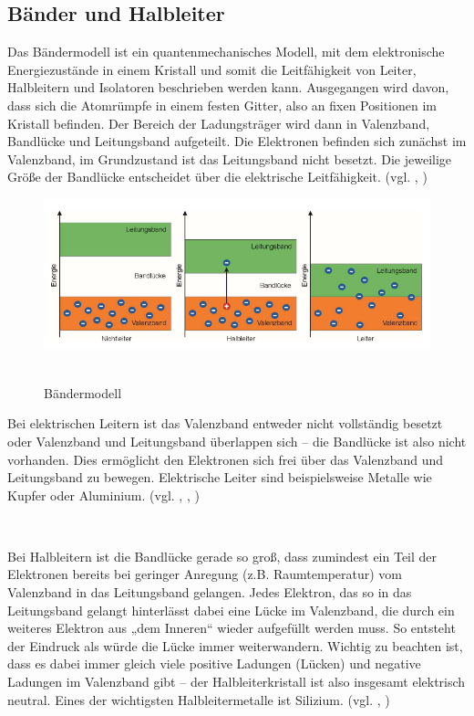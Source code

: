 \documentclass{article}
\begin{document}
\subsection{Bänder und Halbleiter}

Das Bändermodell ist ein quantenmechanisches Modell, mit dem elektronische Energiezustände in einem Kristall und somit die Leitfähigkeit von Leiter, Halbleitern und Isolatoren beschrieben werden kann. Ausgegangen wird davon, dass sich die Atomrümpfe in einem festen Gitter, also an fixen Positionen im Kristall befinden. Der Bereich der Ladungsträger wird dann in Valenzband, Bandlücke und Leitungsband aufgeteilt. Die Elektronen befinden sich zunächst im Valenzband, im Grundzustand ist das Leitungsband nicht besetzt. Die jeweilige Größe der Bandlücke entscheidet über die elektrische Leitfähigkeit. (vgl. \cite{moodle}, \cite{halbleiter})


\begin{figure}[H]
\caption{Bändermodell}
\label{fig:baender}
{\centering
\includegraphics[scale=1.7]{baender.png}
~
}
\end{figure}


Bei elektrischen Leitern ist das Valenzband entweder nicht vollständig besetzt oder Valenzband und Leitungsband überlappen sich – die Bandlücke ist also nicht vorhanden. Dies ermöglicht den Elektronen sich frei über das Valenzband und Leitungsband zu bewegen. Elektrische Leiter sind beispielsweise Metalle wie Kupfer oder Aluminium. (vgl. \cite{moodle}, \cite{cosmos}, \cite{greenlane})

~

Bei Halbleitern ist die Bandlücke gerade so groß, dass zumindest ein Teil der Elektronen bereits bei geringer Anregung (z.B. Raumtemperatur) vom Valenzband in das Leitungsband gelangen. Jedes Elektron, das so in das Leitungsband gelangt hinterlässt dabei eine Lücke im Valenzband, die durch ein weiteres Elektron aus „dem Inneren“ wieder aufgefüllt werden muss. So entsteht der Eindruck als würde die Lücke immer weiterwandern. Wichtig zu beachten ist, dass es dabei immer gleich viele positive Ladungen (Lücken) und negative Ladungen im Valenzband gibt – der Halbleiterkristall ist also insgesamt elektrisch neutral. Eines der wichtigsten Halbleitermetalle ist Silizium. (vgl. \cite{moodle}, \cite{lernhelfer})
\end{document}
